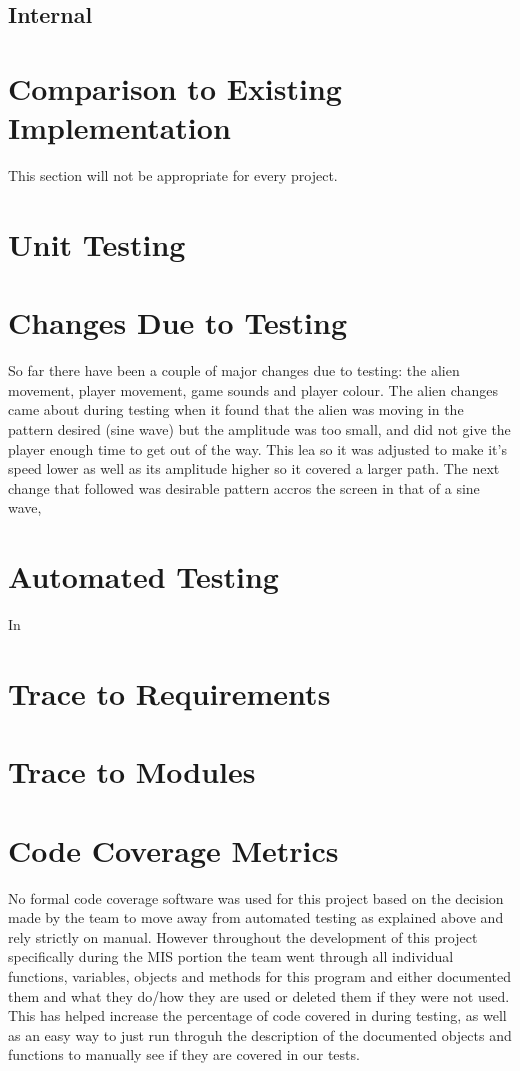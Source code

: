 \documentclass[12pt, titlepage]{article}
\begin{document}
\subsection{Internal}


\section{Comparison to Existing Implementation}

This section will not be appropriate for every project.

\section{Unit Testing}

\section{Changes Due to Testing}
So far there have been a couple of major changes due to testing: the alien movement, player movement, game sounds and player colour. The alien changes came about during testing when it found that the alien was moving in the pattern desired (sine wave) but the amplitude was too small, and did not give the player enough time to get out of the way. This lea so it was adjusted to make it's speed lower as well as its amplitude higher so it covered a larger path. The next change that followed was desirable pattern accros the screen in that of a sine wave,

\section{Automated Testing}
In

\section{Trace to Requirements}

\section{Trace to Modules}

\section{Code Coverage Metrics}
No formal code coverage software was used for this project based on the decision made by the team to move away from automated testing as explained above and rely strictly on manual. However throughout the development of this project specifically during the MIS portion the team went through all individual functions, variables, objects and methods for this program and either documented them and what they do/how they are used or deleted them if they were not used. This has helped increase the percentage of code covered in during testing, as well as an easy way to just run throguh the description of the documented objects and functions to manually see if they are covered in our tests.





\end{document}
